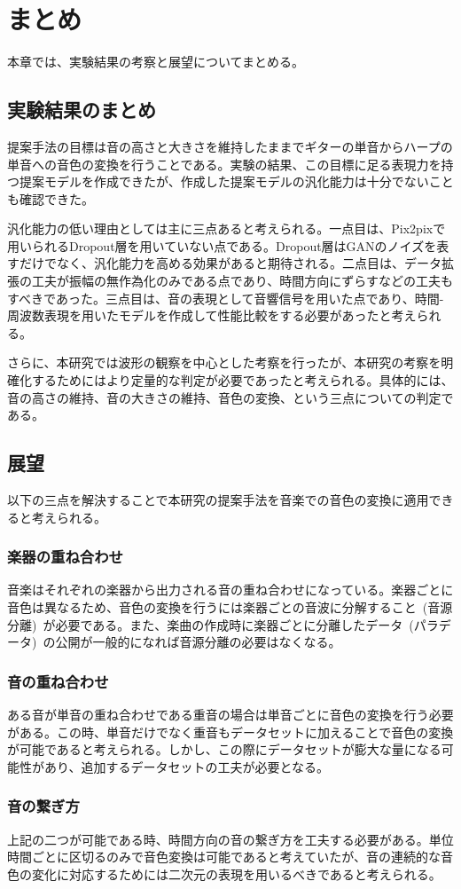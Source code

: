 \chapter{まとめ}

本章では、実験結果の考察と展望についてまとめる。

\section{実験結果のまとめ}

提案手法の目標は音の高さと大きさを維持したままでギターの単音からハープの単音への音色の変換を行うことである。実験の結果、この目標に足る表現力を持つ提案モデルを作成できたが、作成した提案モデルの汎化能力は十分でないことも確認できた。

汎化能力の低い理由としては主に三点あると考えられる。一点目は、Pix2pixで用いられるDropout層を用いていない点である。Dropout層はGANのノイズを表すだけでなく、汎化能力を高める効果があると期待される。二点目は、データ拡張の工夫が振幅の無作為化のみである点であり、時間方向にずらすなどの工夫もすべきであった。三点目は、音の表現として音響信号を用いた点であり、時間-周波数表現を用いたモデルを作成して性能比較をする必要があったと考えられる。

さらに、本研究では波形の観察を中心とした考察を行ったが、本研究の考察を明確化するためにはより定量的な判定が必要であったと考えられる。具体的には、音の高さの維持、音の大きさの維持、音色の変換、という三点についての判定である。

\section{展望}

以下の三点を解決することで本研究の提案手法を音楽での音色の変換に適用できると考えられる。

\subsection{楽器の重ね合わせ}

音楽はそれぞれの楽器から出力される音の重ね合わせになっている。楽器ごとに音色は異なるため、音色の変換を行うには楽器ごとの音波に分解すること~(音源分離)~が必要である。また、楽曲の作成時に楽器ごとに分離したデータ~(パラデータ)~の公開が一般的になれば音源分離の必要はなくなる。

\subsection{音の重ね合わせ}

ある音が単音の重ね合わせである重音の場合は単音ごとに音色の変換を行う必要がある。この時、単音だけでなく重音もデータセットに加えることで音色の変換が可能であると考えられる。しかし、この際にデータセットが膨大な量になる可能性があり、追加するデータセットの工夫が必要となる。

\subsection{音の繋ぎ方}

上記の二つが可能である時、時間方向の音の繋ぎ方を工夫する必要がある。単位時間ごとに区切るのみで音色変換は可能であると考えていたが、音の連続的な音色の変化に対応するためには二次元の表現を用いるべきであると考えられる。
